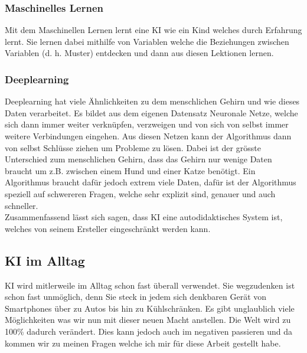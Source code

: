 \subsubsection{Maschinelles Lernen}

Mit dem Maschinellen Lernen lernt eine KI wie ein Kind welches durch Erfahrung lernt. Sie lernen dabei mithilfe von Variablen welche die Beziehungen zwischen Variablen (d. h. Muster) entdecken und dann aus diesen Lektionen lernen.

\subsubsection{Deeplearning}

Deeplearning hat viele Ähnlichkeiten zu dem menschlichen Gehirn und wie dieses Daten verarbeitet.
Es bildet aus dem eigenen Datensatz Neuronale Netze, welche sich dann immer weiter verknüpfen, verzweigen und von sich von selbst immer weitere Verbindungen eingehen. Aus diesen Netzen kann der Algorithmus dann von selbst Schlüsse ziehen um Probleme zu lösen.
Dabei ist der grösste Unterschied zum menschlichen Gehirn, dass das Gehirn nur wenige Daten braucht um z.B. zwischen einem Hund und einer Katze benötigt. Ein Algorithmus braucht dafür jedoch extrem viele Daten,
 dafür ist der Algorithmus speziell auf schwereren Fragen, welche sehr explizit sind, genauer und auch schneller.
\\
Zusammenfassend lässt sich sagen, dass KI eine autodidaktisches System ist, welches von seinem Ersteller eingeschränkt werden kann.  \citep{Was-ist-KI?}

\subsection{KI im Alltag}
KI wird mitlerweile im Alltag schon fast überall verwendet. Sie wegzudenken ist schon fast unmöglich, denn Sie steck in jedem sich denkbaren Gerät von Smartphones über zu Autos bis hin zu Kühlschränken.
Es gibt unglaublich viele Möglichkeiten was wir nun mit dieser neuen Macht anstellen. Die Welt wird zu 100\% dadurch verändert. Dies kann jedoch auch im negativen passieren und da kommen wir zu meinen Fragen welche ich mir für diese Arbeit gestellt habe.


